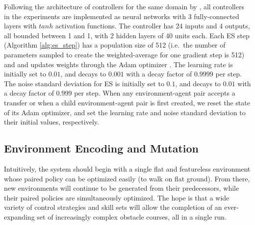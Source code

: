 \documentclass{article}
\newcommand{\jc}[1]{\comments{\textcolor{deepForestGreen}{[JC: #1]}}}
\newcommand{\jl}[1]{\comments{\textcolor{magenta}{[Joel: #1]}}}
\newcommand{\ks}[1]{\comments{\textcolor{purple}{[Ken: #1]}}}
\newcommand{\rw}[1]{\comments{\textcolor{blue}{[Rui: #1]}}}
\newcommand{\comments}[1]{#1}
\begin{document}
Following the architecture of controllers for the same domain by \citet{davidha:arxiv18},
all controllers in the experiments are implemented as neural networks with 3 fully-connected layers with $tanh$ activation  functions. The controller has 24 inputs and 4 outputs, all bounded between \text{-}1 and 1, with 2 hidden layers of 40 units each. Each ES step (Algorithm \ref{alg:es_step}) has a population size of 512 (i.e.\ the number of parameters sampled to create the weighted-average for one  gradient step is 512) and and updates weights through the Adam optimizer \cite{kingma2014adam}.
The learning rate is initially set to $0.01$, and decays to $0.001$ with a decay factor of $0.9999$ per step. The noise standard deviation for ES
is initially set to $0.1$, and decays to $0.01$ with a decay factor of $0.999$ per step. When any environment-agent pair accepts a transfer or when a child environment-agent pair is first created, we reset the state of its Adam optimizer, and set the learning rate and noise standard deviation to their initial values, respectively. 

\subsection{Environment Encoding and Mutation}

Intuitively, the system should begin with a single flat and featureless environment 
whose paired policy can be optimized easily (to walk on flat ground).  
From there, new environments will continue to be generated from their predecessors, while their paired policies are simultaneously optimized.
The hope is that a wide variety of control strategies and skill sets will allow the completion of an ever-expanding set of increasingly complex obstacle courses, all in a single run.  
\end{document}
